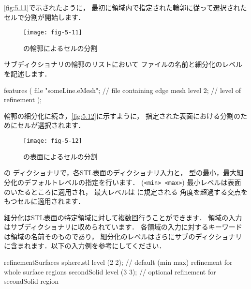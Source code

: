 \autoref{fig:5.11}で示されたように，
最初に領域内で指定された輪郭に従って選択されたセルで分割が開始します．


\begin{figure}[ht]
 \texttt{[image: fig-5-11]}
 \caption{の輪郭によるセルの分割}
 \label{fig:5.11}
\end{figure}


サブディクショナリの輪郭のリストにおいて
ファイルの名前と細分化のレベルを記述します．
\begin{OFverbatim}[file]
features
  (
      {
          file "someLine.eMesh"; // file containing edge mesh
          level 2;               // level of refinement
      }
  );
\end{OFverbatim}

輪郭の細分化に続き，\autoref{fig:5.12}に示すように，
指定された表面における分割のためにセルが選択されます．


\begin{figure}[ht]
 \texttt{[image: fig-5-12]}
 \caption{の表面によるセルの分割}
 \label{fig:5.12}
\end{figure}


の
ディクショナリで，各STL表面のディクショナリ入力と，
型の最小，最大細分化のデフォルトレベルの指定を行います．
(\verb|<min> <max>|) 最小レベルは表面のいたるところに適用され，
最大レベルは
%
%
に規定される
角度を超過する交点をもつセルに適用されます．

細分化はSTL表面の特定領域に対して複数回行うことができます．
領域の入力はサブディクショナリに収められています．
各領域の入力に対するキーワードは領域の名前そのものであり，
細分化のレベルはさらにサブのディクショナリに含まれます．以下の入力例を参考にしてください．
\begin{OFverbatim}[file]
refinementSurfaces
  {
      sphere.stl
      {
          level (2 2); // default (min max) refinement for whole surface
          regions
          {
              secondSolid
              {
                  level (3 3); // optional refinement for secondSolid region
              }
          }
      }
  }
\end{OFverbatim}


